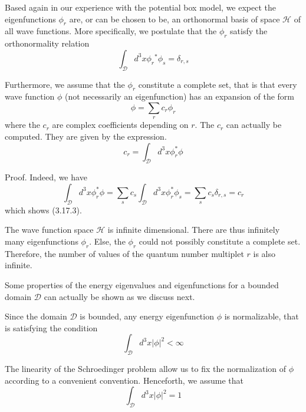 \documentclass{article}
\begin{document}
Based again in our experience with the potential box model, we expect the eigenfunctions $\phi_{r}$ are, or can be chosen to be, an orthonormal basis of space $\mathcal{H}$ of all wave functions. More specifically, we postulate that the $\phi_{r}$ satisfy the orthonormality relation
$$
\begin{equation*}
\int_{\mathcal{D}} d^{3} x \phi_{r}{ }^{*} \phi_{s}=\delta_{r, s} \tag{3.17.1}
\end{equation*}
$$

Furthermore, we assume that the $\phi_{r}$ constitute a complete set, that is that every wave function $\phi$ (not necessarily an eigenfunction) has an expansion of the form
$$
\begin{equation*}
\phi=\sum_{r} c_{r} \phi_{r} \tag{3.17.2}
\end{equation*}
$$
where the $c_{r}$ are complex coefficients depending on $r$. The $c_{r}$ can actually be computed. They are given by the expression.
$$
\begin{equation*}
c_{r}=\int_{\mathcal{D}} d^{3} x \phi_{r}^{*} \phi \tag{3.17.3}
\end{equation*}
$$

Proof. Indeed, we have
$$
\begin{equation*}
\int_{\mathcal{D}} d^{3} x \phi_{r}^{*} \phi=\sum_{s} c_{s} \int_{\mathcal{D}} d^{3} x \phi_{r}^{*} \phi_{s}=\sum_{s} c_{s} \delta_{r, s}=c_{r} \tag{3.17.4}
\end{equation*}
$$
which shows (3.17.3).

The wave function space $\mathcal{H}$ is infinite dimensional. There are thus infinitely many eigenfunctions $\phi_{r}$. Else, the $\phi_{r}$ could not possibly constitute a complete set. Therefore, the number of values of the quantum number multiplet $r$ is also infinite.

Some properties of the energy eigenvalues and eigenfunctions for a bounded domain $\mathcal{D}$ can actually be shown as we discuss next.

Since the domain $\mathcal{D}$ is bounded, any energy eigenfunction $\phi$ is normalizable, that is satisfying the condition
$$
\begin{equation*}
\int_{\mathcal{D}} d^{3} x|\phi|^{2}<\infty \tag{3.17.5}
\end{equation*}
$$

The linearity of the Schroedinger problem allow us to fix the normalization of $\phi$ according to a convenient convention. Henceforth, we assume that
$$
\begin{equation*}
\int_{\mathcal{D}} d^{3} x|\phi|^{2}=1 \tag{3.17.6}
\end{equation*}
$$
\end{document}
